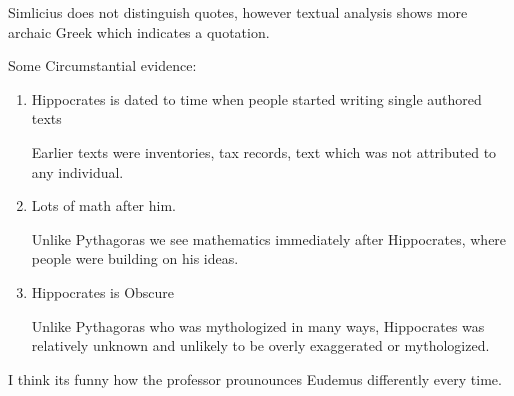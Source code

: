 \documentclass{report}
\begin{document}
\begin{description}
\begin{mdframed}
           Simlicius does not distinguish quotes, however
           textual analysis shows more archaic Greek which
           indicates a quotation.
        \end{mdframed}
        \pagebreak
        \begin{mdframed}
            Some Circumstantial evidence:
            \begin{enumerate}
                \item Hippocrates is dated to time when people
                    started writing single authored texts
                    \begin{mdframed}
                        Earlier texts were inventories,
                        tax records, text which was not
                        attributed to any individual.
                    \end{mdframed}
                \item Lots of math after him.
                    \begin{mdframed}
                        Unlike Pythagoras we see mathematics
                        immediately after Hippocrates, where
                        people were building on his ideas.
                    \end{mdframed}
                \item Hippocrates is Obscure
                    \begin{mdframed}
                        Unlike Pythagoras who was mythologized
                        in many ways, Hippocrates was relatively
                        unknown and unlikely to be overly
                        exaggerated or mythologized.
                    \end{mdframed}
            \end{enumerate}
            \begin{mdframed}
                I think its funny how the professor prounounces
                Eudemus differently every time.
            \end{mdframed}
        \end{mdframed}
\end{description}
\end{document}
